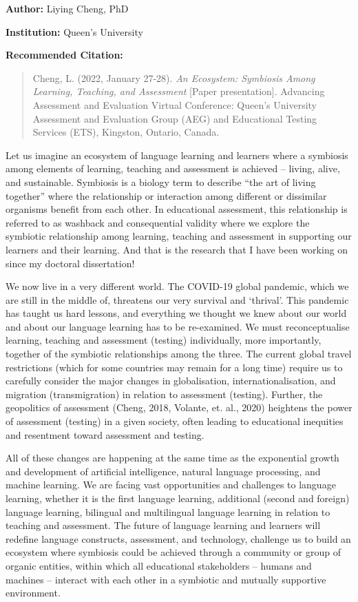 \documentclass[
]{book}
\begin{document}
\textbf{Author:} Liying Cheng, PhD

\textbf{Institution:} Queen's University

\textbf{Recommended Citation:}

\begin{quote}
Cheng, L. (2022, January 27-28). \emph{An Ecosystem: Symbiosis Among Learning, Teaching, and Assessment} {[}Paper presentation{]}. Advancing Assessment and Evaluation Virtual Conference: Queen's University Assessment and Evaluation Group (AEG) and Educational Testing Services (ETS), Kingston, Ontario, Canada.
\end{quote}

Let us imagine an ecosystem of language learning and learners where a symbiosis among elements of learning, teaching and assessment is achieved -- living, alive, and sustainable. Symbiosis is a biology term to describe ``the art of living together'' where the relationship or interaction among different or dissimilar organisms benefit from each other. In educational assessment, this relationship is referred to as washback and consequential validity where we explore the symbiotic relationship among learning, teaching and assessment in supporting our learners and their learning. And that is the research that I have been working on since my doctoral dissertation!

We now live in a very different world. The COVID-19 global pandemic, which we are still in the middle of, threatens our very survival and `thrival'. This pandemic has taught us hard lessons, and everything we thought we knew about our world and about our language learning has to be re-examined. We must reconceptualise learning, teaching and assessment (testing) individually, more importantly, together of the symbiotic relationships among the three. The current global travel restrictions (which for some countries may remain for a long time) require us to carefully consider the major changes in globalisation, internationalisation, and migration (transmigration) in relation to assessment (testing). Further, the geopolitics of assessment (Cheng, 2018, Volante, et. al., 2020) heightens the power of assessment (testing) in a given society, often leading to educational inequities and resentment toward assessment and testing.

All of these changes are happening at the same time as the exponential growth and development of artificial intelligence, natural language processing, and machine learning. We are facing vast opportunities and challenges to language learning, whether it is the first language learning, additional (second and foreign) language learning, bilingual and multilingual language learning in relation to teaching and assessment. The future of language learning and learners will redefine language constructs, assessment, and technology, challenge us to build an ecosystem where symbiosis could be achieved through a community or group of organic entities, within which all educational stakeholders -- humans and machines -- interact with each other in a symbiotic and mutually supportive environment.
\end{document}
